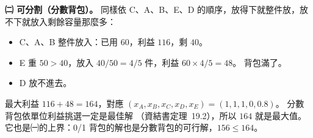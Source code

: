 \begin{pastsoln}
\textbf{㈡ 可分割（分數背包）。} 同樣依 C、A、B、E、D 的順序，放得下就整件放，放不下就放入剩餘容量那麼多：
\begin{itemize}
\item C、A、B 整件放入：已用 $60$，利益 $116$，剩 $40$。
\item E 重 $50 > 40$，放入 $40/50 = 4/5$ 件，利益 $60 \times 4/5 = 48$。 背包滿了。
\item D 放不進去。
\end{itemize}
最大利益 $116 + 48 = 164$，對應 $(x_A, x_B, x_C, x_D, x_E) = (1, 1, 1, 0, 0.8)$。 分數背包依單位利益挑選一定是最佳解
（資結書定理~19.2），所以 $164$ 就是最大值。 它也是㈠的上界：0/1 背包的解也是分數背包的可行解，$156 \le 164$。
\end{pastsoln}
